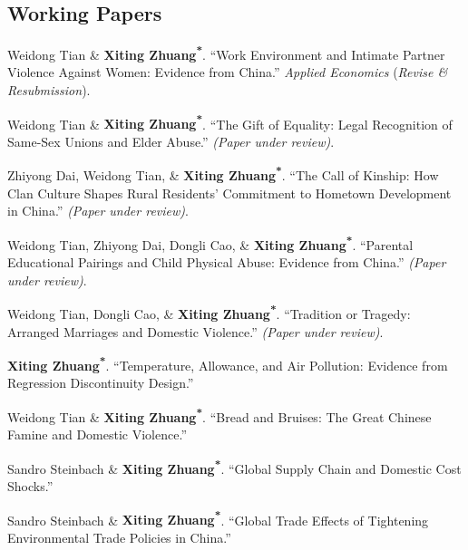 \documentclass[10.5pt,letterpaper]{article}
\newcommand{\corrauthor}{\textsuperscript{*}}
\renewenvironment{itemize}{
	\begin{list}{}{
			\setlength{\leftmargin}{1.5em}
		}
	}{
	\end{list}
}
\begin{document}
	\subsection*{\textbf{Working Papers}}
	\begin{itemize}
				\item[-] Weidong Tian \& \textbf{Xiting Zhuang\corrauthor}.  
		``Work Environment and Intimate Partner Violence Against Women: Evidence from China.''  
		\textit{Applied Economics} (\textit{Revise \& Resubmission}). 
		
		
		\item[-] Weidong Tian \& \textbf{Xiting Zhuang\corrauthor}.  
		``The Gift of Equality: Legal Recognition of Same-Sex Unions and Elder Abuse.''  
		\textit{(Paper under review)}.
		
		\item[-] Zhiyong Dai, Weidong Tian, \& \textbf{Xiting Zhuang\corrauthor}.  
		``The Call of Kinship: How Clan Culture Shapes Rural Residents’ Commitment to Hometown Development in China.''  
		\textit{(Paper under review)}.
		
		\item[-] Weidong Tian, Zhiyong Dai, Dongli Cao, \& \textbf{Xiting Zhuang\corrauthor}.  
		``Parental Educational Pairings and Child Physical Abuse: Evidence from China.''  
		\textit{(Paper under review)}.
		
				\item[-] Weidong Tian, Dongli Cao, \& \textbf{Xiting Zhuang\corrauthor}.  
		``Tradition or Tragedy: Arranged Marriages and Domestic Violence.''
		\textit{(Paper under review)}. 
		
		
		\item[-] \textbf{Xiting Zhuang\corrauthor}.  
		``Temperature, Allowance, and Air Pollution: Evidence from Regression Discontinuity Design.''
		

		
		\item[-] Weidong Tian \& \textbf{Xiting Zhuang\corrauthor}.  
		``Bread and Bruises: The Great Chinese Famine and Domestic Violence.''
		
		\item[-] Sandro Steinbach \& \textbf{Xiting Zhuang\corrauthor}.  
		``Global Supply Chain and Domestic Cost Shocks.''
		
		\item[-] Sandro Steinbach \& \textbf{Xiting Zhuang\corrauthor}.  
		``Global Trade Effects of Tightening Environmental Trade Policies in China.''
	\end{itemize}
	
\end{document}
